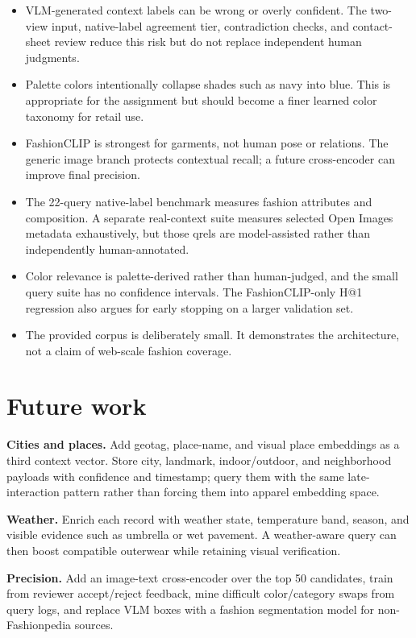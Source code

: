 \documentclass[11pt]{article}
\begin{document}
\begin{itemize}
  \item VLM-generated context labels can be wrong or overly confident. The two-view input, native-label agreement tier, contradiction checks, and contact-sheet review reduce this risk but do not replace independent human judgments.
  \item Palette colors intentionally collapse shades such as navy into blue. This is appropriate for the assignment but should become a finer learned color taxonomy for retail use.
  \item FashionCLIP is strongest for garments, not human pose or relations. The generic image branch protects contextual recall; a future cross-encoder can improve final precision.
  \item The 22-query native-label benchmark measures fashion attributes and composition. A separate real-context suite measures selected Open Images metadata exhaustively, but those qrels are model-assisted rather than independently human-annotated.
  \item Color relevance is palette-derived rather than human-judged, and the small query suite has no confidence intervals. The FashionCLIP-only H@1 regression also argues for early stopping on a larger validation set.
  \item The provided corpus is deliberately small. It demonstrates the architecture, not a claim of web-scale fashion coverage.
\end{itemize}

\section{Future work}

\textbf{Cities and places.} Add geotag, place-name, and visual place embeddings as a third context vector. Store city, landmark, indoor/outdoor, and neighborhood payloads with confidence and timestamp; query them with the same late-interaction pattern rather than forcing them into apparel embedding space.

\textbf{Weather.} Enrich each record with weather state, temperature band, season, and visible evidence such as umbrella or wet pavement. A weather-aware query can then boost compatible outerwear while retaining visual verification.

\textbf{Precision.} Add an image-text cross-encoder over the top 50 candidates, train from reviewer accept/reject feedback, mine difficult color/category swaps from query logs, and replace VLM boxes with a fashion segmentation model for non-Fashionpedia sources.
\end{document}
